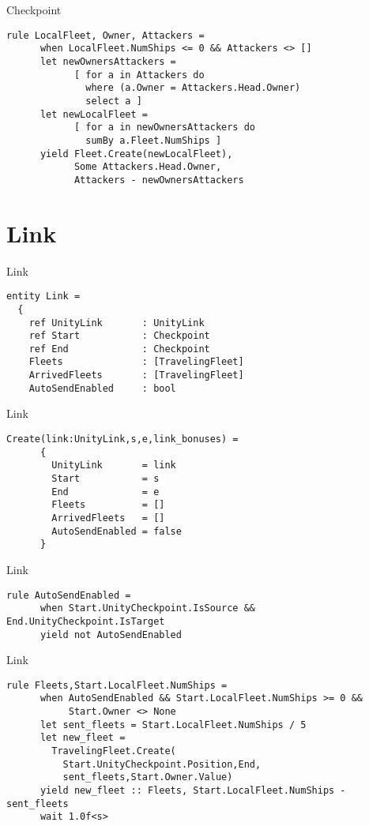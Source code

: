 \documentclass{beamer}
\begin{document}
\begin{frame}[fragile]{Checkpoint}
\begin{lstlisting}[frame=shadowbox]
    rule LocalFleet, Owner, Attackers =
      when LocalFleet.NumShips <= 0 && Attackers <> []
      let newOwnersAttackers = 
            [ for a in Attackers do
              where (a.Owner = Attackers.Head.Owner)
              select a ]
      let newLocalFleet = 
            [ for a in newOwnersAttackers do
              sumBy a.Fleet.NumShips ]
      yield Fleet.Create(newLocalFleet), 
            Some Attackers.Head.Owner, 
            Attackers - newOwnersAttackers
\end{lstlisting}
\end{frame}


\section{Link}
\begin{frame}[fragile]{Link}
\begin{lstlisting}[frame=shadowbox]
entity Link = 
  {
    ref UnityLink       : UnityLink
    ref Start           : Checkpoint
    ref End             : Checkpoint
    Fleets              : [TravelingFleet]
    ArrivedFleets       : [TravelingFleet]
    AutoSendEnabled     : bool
\end{lstlisting}
\end{frame}

\begin{frame}[fragile]{Link}
\begin{lstlisting}[frame=shadowbox]
    Create(link:UnityLink,s,e,link_bonuses) =
      {
        UnityLink       = link
        Start           = s
        End             = e
        Fleets          = []
        ArrivedFleets   = []
        AutoSendEnabled = false
      }
\end{lstlisting}
\end{frame}

\begin{frame}[fragile]{Link}
\begin{lstlisting}[frame=shadowbox]
    rule AutoSendEnabled =
      when Start.UnityCheckpoint.IsSource && End.UnityCheckpoint.IsTarget
      yield not AutoSendEnabled
\end{lstlisting}
\end{frame}

\begin{frame}[fragile]{Link}
\begin{lstlisting}[frame=shadowbox]
    rule Fleets,Start.LocalFleet.NumShips =
      when AutoSendEnabled && Start.LocalFleet.NumShips >= 0 && 
           Start.Owner <> None
      let sent_fleets = Start.LocalFleet.NumShips / 5
      let new_fleet = 
      	TravelingFleet.Create(
      	  Start.UnityCheckpoint.Position,End,
      	  sent_fleets,Start.Owner.Value)
      yield new_fleet :: Fleets, Start.LocalFleet.NumShips - sent_fleets
      wait 1.0f<s>
\end{lstlisting}
\end{frame}
\end{document}
